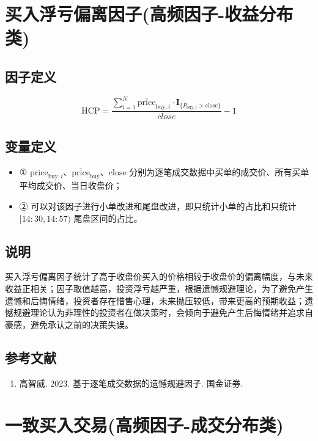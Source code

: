 \documentclass{article}
\begin{document}
\section{买入浮亏偏离因子(高频因子-收益分布类)}

\subsection{因子定义}
\begin{equation}
    \mathrm{HCP} = \frac{\sum_{i=1}^{N} \overline{\mathrm{price}}_{\mathrm{buy},i} \cdot \mathbf{I}_{\{P_{\mathrm{buy},i} > \mathrm{close}\}}}{close} - 1
\end{equation}

\subsection{变量定义}

\begin{itemize}
    \item ① \( \mathrm{price}_{\mathrm{buy},i} \)、\( \overline{\mathrm{price}}_{\mathrm{buy}} \)、\( \mathrm{close} \) 分别为逐笔成交数据中买单的成交价、所有买单平均成交价、当日收盘价；
    \item ② 可以对该因子进行小单改进和尾盘改进，即只统计小单的占比和只统计 \([14:30,14:57)\) 尾盘区间的占比。
\end{itemize}

\subsection{说明}
买入浮亏偏离因子统计了高于收盘价买入的价格相较于收盘价的偏离幅度，与未来收益正相关；因子取值越高，投资浮亏越严重，根据遗憾规避理论，为了避免产生遗憾和后悔情绪，投资者存在惜售心理，未来抛压较低，带来更高的预期收益；遗憾规避理论认为非理性的投资者在做决策时，会倾向于避免产生后悔情绪并追求自豪感，避免承认之前的决策失误。

\subsection{参考文献}
\begin{enumerate}
    \item 高智威. 2023. 基于逐笔成交数据的遗憾规避因子. 国金证券.
\end{enumerate}

\section{一致买入交易(高频因子-成交分布类)}
\end{document}
